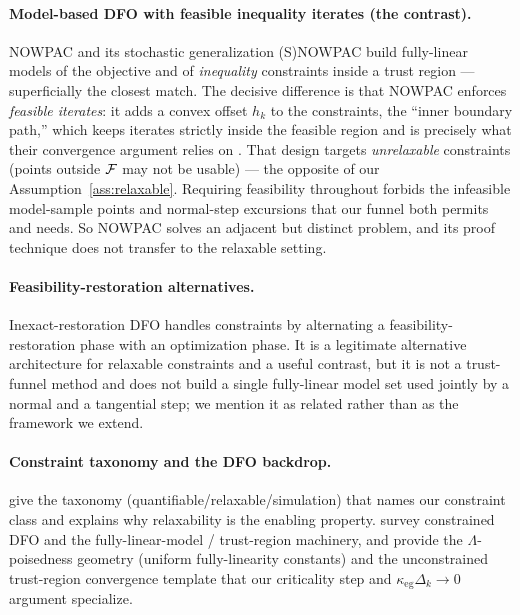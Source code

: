 \paragraph{Model-based DFO with feasible inequality iterates (the contrast).}
NOWPAC \citep{AugustinMarzouk2017} and its stochastic generalization (S)NOWPAC
\citep{Menhorn2022} build fully-linear models of the objective and of
\emph{inequality} constraints inside a trust region --- superficially the closest
match. The decisive difference is that NOWPAC enforces \emph{feasible iterates}:
it adds a convex offset $h_k$ to the constraints, the ``inner boundary path,''
which keeps iterates strictly inside the feasible region and is precisely what
their convergence argument relies on \citep[\S4]{Menhorn2022}. That design
targets \emph{unrelaxable} constraints (points outside $\mathcal{F}$ may not be usable)
--- the opposite of our Assumption~\ref{ass:relaxable}. Requiring feasibility
throughout forbids the infeasible model-sample points and normal-step excursions
that our funnel both permits and needs. So NOWPAC solves an adjacent but distinct
problem, and its proof technique does not transfer to the relaxable setting.

\paragraph{Feasibility-restoration alternatives.}
Inexact-restoration DFO \citep{Birgin2021} handles constraints by alternating a
feasibility-restoration phase with an optimization phase. It is a legitimate
alternative architecture for relaxable constraints and a useful contrast, but it
is not a trust-funnel method and does not build a single fully-linear model set
used jointly by a normal and a tangential step; we mention it as related rather
than as the framework we extend.

\paragraph{Constraint taxonomy and the DFO backdrop.}
\citet{LeDigabelWild2015} give the taxonomy (quantifiable/relaxable/simulation)
that names our constraint class and explains why relaxability is the enabling
property. \citet{LMW2019} survey constrained DFO and the fully-linear-model /
trust-region machinery, and \citet[Ch.~6,10,11]{CSV2009} provide the
$\Lambda$-poisedness geometry (uniform fully-linearity constants) and the
unconstrained trust-region convergence template that our criticality step and
$\kappa_{\mathrm{eg}}\Delta_k\to0$ argument specialize.

